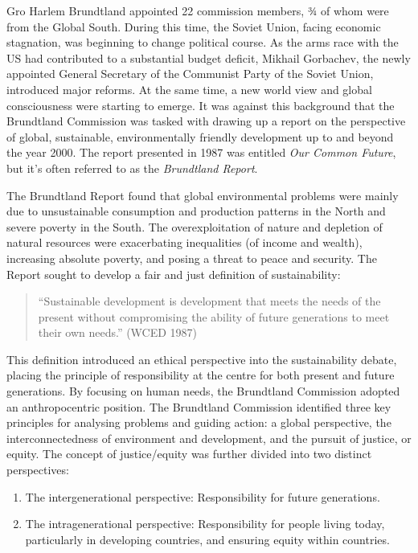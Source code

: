 \documentclass[
  a4paper,
  openany]{book}
\providecommand{\tightlist}{%
  \setlength{\itemsep}{0pt}\setlength{\parskip}{0pt}}
\begin{document}
Gro Harlem Brundtland appointed 22 commission members, ¾ of whom were
from the Global South. During this time, the Soviet Union, facing
economic stagnation, was beginning to change political course. As the
arms race with the US had contributed to a substantial budget deficit,
Mikhail Gorbachev, the newly appointed General Secretary of the
Communist Party of the Soviet Union, introduced major reforms. At the
same time, a new world view and global consciousness were starting to
emerge. It was against this background that the Brundtland Commission
was tasked with drawing up a report on the perspective of global,
sustainable, environmentally friendly development up to and beyond the
year 2000. The report presented in 1987 was entitled \emph{Our Common
Future}, but it's often referred to as the \emph{Brundtland Report}.

The Brundtland Report found that global environmental problems were
mainly due to unsustainable consumption and production patterns in the
North and severe poverty in the South. The overexploitation of nature
and depletion of natural resources were exacerbating inequalities (of
income and wealth), increasing absolute poverty, and posing a threat to
peace and security. The Report sought to develop a fair and just
definition of sustainability:

\begin{quote}
``Sustainable development is development that meets the needs of the
present without compromising the ability of future generations to meet
their own needs.'' (WCED 1987)
\end{quote}

This definition introduced an ethical perspective into the
sustainability debate, placing the principle of responsibility at the
centre for both present and future generations. By focusing on human
needs, the Brundtland Commission adopted an anthropocentric position.
The Brundtland Commission identified three key principles for analysing
problems and guiding action: a global perspective, the
interconnectedness of environment and development, and the pursuit of
justice, or equity. The concept of justice/equity was further divided
into two distinct perspectives:

\begin{enumerate}
\def\labelenumi{\arabic{enumi}.}
\tightlist
\item
  The intergenerational perspective: Responsibility for future
  generations.
\item
  The intragenerational perspective: Responsibility for people living
  today, particularly in developing countries, and ensuring equity
  within countries.
\end{enumerate}
\end{document}
